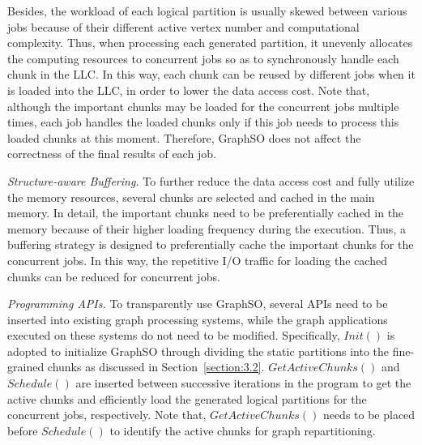 \documentclass[10pt,journal,compsoc]{IEEEtran}
\begin{document}

Besides, the workload of each logical partition is usually skewed between various jobs because of their different active vertex number and computational complexity. Thus, when processing each generated partition, it unevenly allocates the computing resources to concurrent jobs so as to synchronously handle each chunk in the LLC.
In this way, each chunk can be reused by different jobs when it is loaded into the LLC, in order to lower the data access cost.
Note that, although the important chunks may be loaded for the concurrent jobs multiple times, each job handles the loaded chunks only if this job needs to process this loaded chunks at this moment. Therefore, GraphSO does not affect the correctness of the final results of each job.

\textit{Structure-aware Buffering.} To further reduce the data access cost and fully utilize the memory resources, several chunks are selected and cached in the main memory. In detail, the important chunks need to be preferentially cached in the memory because of their higher loading frequency during the execution. %
Thus, a buffering strategy is designed to preferentially cache the important chunks for the concurrent jobs.
In this way, the repetitive I/O traffic for loading the cached chunks can be reduced for concurrent jobs.

\textit{Programming APIs.} To transparently use GraphSO, several APIs need to be inserted into existing graph processing systems, while the graph applications executed on these systems do not need to be modified. Specifically, $Init()$ is adopted to initialize GraphSO through dividing the static partitions into the fine-grained chunks as discussed in Section~\ref{section:3.2}. $GetActiveChunks()$ and $Schedule()$ are inserted between successive iterations in the program to get the active chunks and efficiently load the generated logical partitions for the concurrent jobs, respectively. Note that, $GetActiveChunks()$ needs to be placed before $Schedule()$ to identify the active chunks for graph repartitioning.


\vspace{-8pt}
\end{document}
